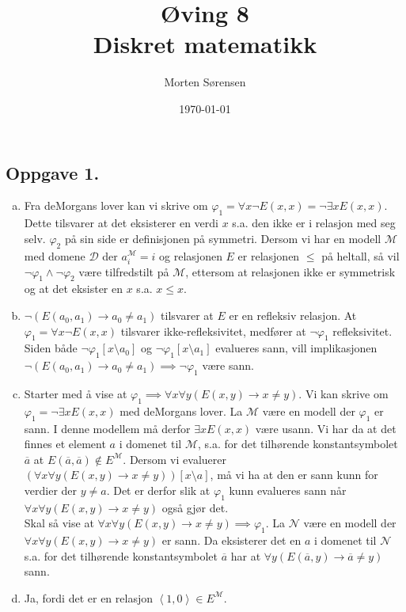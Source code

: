 \documentclass{article}
\title{\huge{Øving 8\\ Diskret matematikk}}
\author{Morten Sørensen}
\date{\today}
\begin{document}
\maketitle

\subsection*{Oppgave 1.}
\begin{enumerate}[(a)]
    \item {
        Fra deMorgans lover kan vi skrive om $\varphi_1 = \forall x \neg E(x, x) = \neg \exists x E(x, x)$.
        Dette tilsvarer at det eksisterer en verdi $x$ s.a. den ikke er i relasjon med seg selv. 
        $\varphi_2$ på sin side er definisjonen på symmetri. Dersom vi har en modell $\mathcal{M}$ med domene 
        $\mathcal{D}$ der $a_i^{\mathcal{M}} = i$ og relasjonen $E$ er relasjonen $\leq$ på 
        heltall, så vil $\neg \varphi_1 \wedge \neg \varphi_2$ være tilfredstilt på $\mathcal{M}$, 
        ettersom at relasjonen ikke er symmetrisk og at det eksister en $x$ s.a. $x \leq x$.        
    }
    \item {
        $\neg (E(a_0, a_1) \rightarrow a_0 \neq a_1)$ tilsvarer at $E$ er en refleksiv relasjon.
        At $\varphi_1 = \forall x \neg E(x, x)$ tilsvarer ikke-refleksivitet, medfører at $\neg \varphi_1$ 
        refleksivitet. Siden både $\neg\varphi_1[x \setminus a_0]$ og $\neg\varphi_1[x \setminus a_1]$ evalueres sann, 
        vill implikasjonen $\neg (E(a_0, a_1) \rightarrow a_0 \neq a_1) \implies \neg \varphi_1$ være sann.
    }
    \item {
        Starter med å vise at $\varphi_1 \implies \forall x \forall y (E(x, y) \rightarrow x \neq y)$.
        Vi kan skrive om $\varphi_1 = \neg \exists x E(x, x)$ med deMorgans lover. La $\mathcal{M}$ være 
        en modell der $\varphi_1$ er sann. I denne modellem må derfor $\exists x E(x, x)$ være usann.
        Vi har da at det finnes et element $a$ i domenet til $\mathcal{M}$, s.a. for det 
        tilhørende konstantsymbolet $\overline{a}$ at $E(\overline{a}, \overline{a}) \notin E^{\mathcal{M}}$.
        Dersom vi evaluerer $(\forall x \forall y (E(x, y) \rightarrow x \neq y))[x \setminus a]$, må 
        vi ha at den er sann kunn for verdier der $y \neq a$.
        Det er derfor slik at $\varphi_1$ kunn evalueres sann når $\forall x \forall y (E(x, y) \rightarrow x \neq y)$ også gjør det. \\
        Skal så vise at $\forall x \forall y (E(x, y) \rightarrow x \neq y) \implies \varphi_1$.
        La $\mathcal{N}$ være en modell der $\forall x \forall y (E(x, y) \rightarrow x \neq y)$ er sann.
        Da eksisterer det en $a$ i domenet til $\mathcal{N}$ s.a. for det tilhørende konstantsymbolet $\overline{a}$
        har at $\forall y (E(\overline{a}, y) \rightarrow \overline{a} \neq y)$ sann. 
    }
    \item {
        Ja, fordi det er en relasjon $\left<1, 0\right> \in E^{\mathcal{M}}$. 
    }
\end{enumerate}
\end{document}
